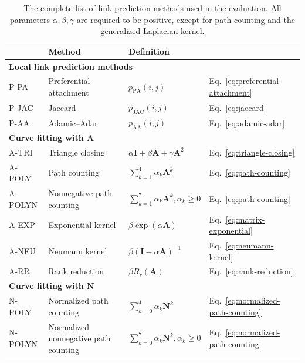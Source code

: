 \documentclass[11pt,a4paper]{book}
\newcommand{\syRank}{r}
\begin{document}
\begin{table}
  \centering
  \caption{
    The complete list of link prediction methods used in the
    evaluation.  All parameters $\alpha, \beta, \gamma$ are required to
    be positive, except for path counting and the generalized Laplacian
    kernel. 
  }
  \begin{tabular}{ l l @{\qquad} l @{\qquad} l }
    \toprule
    & \textbf{Method} & \textbf{Definition}  \\
    \midrule
    \multicolumn{4}{l}{\textbf{Local link prediction methods}} \\
    \textrm{P-PA} & Preferential attachment &
    $p_{\mathrm{PA}}(i,j)$ & Eq.~\ref{eq:preferential-attachment} \\
    \textrm{P-JAC} & Jaccard & $p_{\mathrm{JAC}}(i,j)$ & Eq.~\ref{eq:jaccard} \\
    \textrm{P-AA} & Adamic--Adar 
    & $p_{\mathrm{AA}}(i,j)$ & Eq.~\ref{eq:adamic-adar} \\
    \midrule
    \multicolumn{4}{l}{\textbf{Curve fitting with $\mathbf A$}} \\
    \textrm{A-TRI} & Triangle closing & $\alpha \mathbf I + \beta \mathbf
    A + \gamma \mathbf A^2$ & Eq.~\ref{eq:triangle-closing} \\
    \textrm{A-POLY} & Path counting & $\sum_{k=1}^4 \alpha_k \mathbf A^k$ &
    Eq.~\ref{eq:path-counting}  \\
    \textrm{A-POLYN} & Nonnegative path counting & $\sum_{k=1}^7 \alpha_k
    \mathbf A^k, \alpha_k \geq 0$ &
    Eq.~\ref{eq:path-counting} \\
    \textrm{A-EXP} & Exponential kernel & $\beta\exp(\alpha \mathbf A)$
    & Eq.~\ref{eq:matrix-exponential} \\
    \textrm{A-NEU} & Neumann kernel & $\beta(\mathbf I - \alpha
    \mathbf A)^{-1}$ & Eq.~\ref{eq:neumann-kernel} \\
    \textrm{A-RR} & Rank reduction & $\beta R_\syRank(\mathbf A)$ &
    Eq.~\ref{eq:rank-reduction} \\ 
    \midrule
    \multicolumn{4}{l}{\textbf{Curve fitting with $\mathbf N$}} \\
    \textrm{N-POLY} & Normalized path counting
    & $\sum_{k=0}^4 \alpha_k \mathbf N^k$ 
    & Eq.~\ref{eq:normalized-path-counting} \\
    \textrm{N-POLYN} & Normalized nonnegative path counting
    & $\sum_{k=0}^7 \alpha_k \mathbf N^k, \alpha_k \geq 0$ 
    & Eq.~\ref{eq:normalized-path-counting} \\

\end{tabular}
\end{table}
\end{document}
